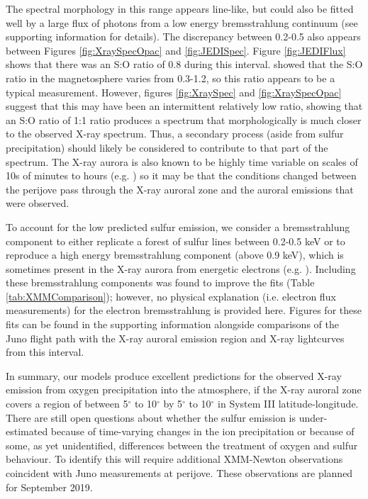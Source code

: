 \documentclass[draft]{agujournal2018}
\begin{document}
The spectral morphology in this range appears line-like, but could also be fitted well by a large flux of photons from a low energy bremsstrahlung continuum (see supporting information for details).
The discrepancy between 0.2-0.5 also appears between Figures \ref{fig:XraySpecOpac} and \ref{fig:JEDISpec}.
Figure \ref{fig:JEDIFlux} shows that there was an S:O ratio of 0.8 during this interval.
\citet{radioti2005,radioti2006} showed that the S:O ratio in the magnetosphere varies from 0.3-1.2, so this ratio appears to be a typical measurement.
However, figures \ref{fig:XraySpec} and \ref{fig:XraySpecOpac} suggest that this may have been an intermittent relatively low ratio, showing that an S:O ratio of 1:1 ratio produces a spectrum that morphologically is much closer to the observed X-ray spectrum.
Thus, a secondary process (aside from sulfur precipitation) should likely be considered to contribute to that part of the spectrum.
The X-ray aurora is also known to be highly time variable on scales of 10s of minutes to hours (e.g. \citet{dunn2017}) so it may be that the conditions changed between the perijove pass through the X-ray auroral zone and the auroral emissions that were observed.

To account for the low predicted sulfur emission, we consider a bremsstrahlung component to either replicate a forest of sulfur lines between 0.2-0.5 keV or to reproduce a high energy bremsstrahlung component (above 0.9 keV), which is sometimes present in the X-ray aurora from energetic electrons (e.g. \citet{branduardi2004,branduardi2008}).
Including these bremsstrahlung components was found to improve the fits (Table \ref{tab:XMMComparison}); however, no physical explanation (i.e. electron flux measurements) for the electron bremsstrahlung is provided here.
Figures for these fits can be found in the supporting information alongside comparisons of the Juno flight path with the X-ray auroral emission region and X-ray lightcurves from this interval.

In summary, our models produce excellent predictions for the observed X-ray emission from oxygen precipitation into the atmosphere, if the X-ray auroral zone covers a region of between 5$^{\circ}$ to 10$^{\circ}$ by 5$^{\circ}$ to 10$^{\circ}$ in System III latitude-longitude.
There are still open questions about whether the sulfur emission is under-estimated because of time-varying changes in the ion precipitation or because of some, as yet unidentified, differences between the treatment of oxygen and sulfur behaviour.
To identify this will require additional XMM-Newton observations coincident with Juno measurements at perijove.
These observations are planned for September 2019.
\end{document}
